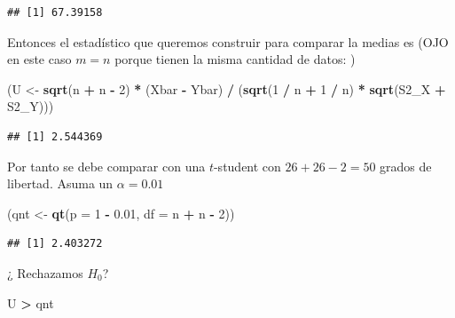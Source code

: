 \documentclass[
  12pt,
]{book}
\newenvironment{Shaded}{\begin{snugshade}}{\end{snugshade}}
\newcommand{\DataTypeTok}[1]{\textcolor[rgb]{0.13,0.29,0.53}{#1}}
\newcommand{\DecValTok}[1]{\textcolor[rgb]{0.00,0.00,0.81}{#1}}
\newcommand{\FloatTok}[1]{\textcolor[rgb]{0.00,0.00,0.81}{#1}}
\newcommand{\KeywordTok}[1]{\textcolor[rgb]{0.13,0.29,0.53}{\textbf{#1}}}
\newcommand{\NormalTok}[1]{#1}
\newcommand{\OperatorTok}[1]{\textcolor[rgb]{0.81,0.36,0.00}{\textbf{#1}}}
\newcommand{\StringTok}[1]{\textcolor[rgb]{0.31,0.60,0.02}{#1}}
\begin{document}
\begin{verbatim}
## [1] 67.39158
\end{verbatim}

Entonces el estadístico que queremos construir para comparar la medias es (OJO en este caso \(m=n\) porque tienen la misma cantidad de datos:
)

\begin{Shaded}
\begin{Highlighting}[]
\NormalTok{(U \textless{}{-}}\StringTok{ }\KeywordTok{sqrt}\NormalTok{(n }\OperatorTok{+}\StringTok{ }\NormalTok{n }\OperatorTok{{-}}\StringTok{ }\DecValTok{2}\NormalTok{) }\OperatorTok{*}\StringTok{ }\NormalTok{(Xbar }\OperatorTok{{-}}\StringTok{ }\NormalTok{Ybar) }\OperatorTok{/}
\StringTok{  }\NormalTok{(}\KeywordTok{sqrt}\NormalTok{(}\DecValTok{1} \OperatorTok{/}\StringTok{ }\NormalTok{n }\OperatorTok{+}\StringTok{ }\DecValTok{1} \OperatorTok{/}\StringTok{ }\NormalTok{n) }\OperatorTok{*}\StringTok{ }\KeywordTok{sqrt}\NormalTok{(S2\_X }\OperatorTok{+}\StringTok{ }\NormalTok{S2\_Y)))}
\end{Highlighting}
\end{Shaded}

\begin{verbatim}
## [1] 2.544369
\end{verbatim}

Por tanto se debe comparar con una \(t\)-student con \(26+26 - 2 = 50\) grados
de libertad. Asuma un \(\alpha = 0.01\)

\begin{Shaded}
\begin{Highlighting}[]
\NormalTok{(qnt \textless{}{-}}\StringTok{ }\KeywordTok{qt}\NormalTok{(}\DataTypeTok{p =} \DecValTok{1} \OperatorTok{{-}}\StringTok{ }\FloatTok{0.01}\NormalTok{, }\DataTypeTok{df =}\NormalTok{ n }\OperatorTok{+}\StringTok{ }\NormalTok{n }\OperatorTok{{-}}\StringTok{ }\DecValTok{2}\NormalTok{))}
\end{Highlighting}
\end{Shaded}

\begin{verbatim}
## [1] 2.403272
\end{verbatim}

¿ Rechazamos \(H_0\)?

\begin{Shaded}
\begin{Highlighting}[]
\NormalTok{U }\OperatorTok{\textgreater{}}\StringTok{ }\NormalTok{qnt}
\end{Highlighting}
\end{Shaded}
\end{document}
